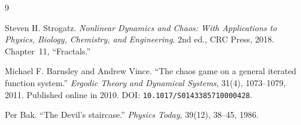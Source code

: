 \documentclass[12pt]{amsart}
\theoremstyle{conjecture}
\theoremstyle{definition}
\theoremstyle{question}
\theoremstyle{theorem}
\begin{document}
    \begin{thebibliography}{9}

        Steven H. Strogatz.
        \emph{Nonlinear Dynamics and Chaos: With Applications to Physics, Biology, Chemistry, and Engineering}.
        2nd ed., CRC Press, 2018.
        Chapter~11, ``Fractals.''

        Michael F. Barnsley and Andrew Vince.
        ``The chaos game on a general iterated function system.''
        \emph{Ergodic Theory and Dynamical Systems}, 31(4), 1073--1079, 2011.
        Published online in 2010.
        DOI: \texttt{10.1017/S0143385710000428}.

        Per Bak.
        ``The Devil's staircase.''
        \emph{Physics Today}, 39(12), 38--45, 1986.

    \end{thebibliography}
\end{document}
